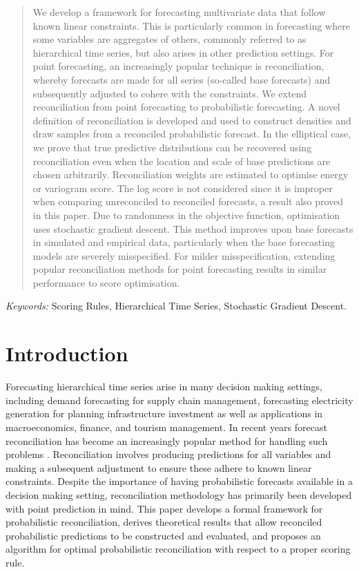 \documentclass[a4paper,12pt]{article}
\theoremstyle{definition}
\begin{document}
\begin{abstract}
We develop a framework for forecasting multivariate data that follow known linear constraints. This is particularly common in forecasting where some variables are aggregates of others, commonly referred to as hierarchical time series, but also arises in other prediction settings. For point forecasting, an increasingly popular technique is reconciliation, whereby forecasts are made for all series (so-called base forecasts) and subsequently adjusted to cohere with the constraints. We extend reconciliation from point forecasting to probabilistic forecasting. A novel definition of reconciliation is developed and used to construct densities and draw samples from a reconciled probabilistic forecast. In the elliptical case, we prove that true predictive distributions can be recovered using reconciliation even when the location and scale of base predictions are chosen arbitrarily. Reconciliation weights are estimated to optimise energy or variogram score. The log score is not considered since it is improper when comparing unreconciled to reconciled forecasts, a result also proved in this paper. Due to randomness in the objective function, optimisation uses stochastic gradient descent. This method improves upon base forecasts in simulated and empirical data, particularly when the base forecasting models are severely misspecified. For milder misspecification, extending popular reconciliation methods for point forecasting results in similar performance to score optimisation.

\end{abstract}

\noindent%
{\it Keywords:}  Scoring Rules, Hierarchical Time Series, Stochastic Gradient Descent.

{}
\section{Introduction}\label{sec:intro}

Forecasting hierarchical time series arise in many decision making settings, including demand forecasting for supply chain management, forecasting electricity generation for planning infrastructure investment as well as applications in macroeconomics, finance, and tourism management. In recent years forecast reconciliation has become an increasingly popular method for handling such problems \citep[see][for an overview]{FPP2018}. Reconciliation involves producing predictions for all variables and making a subsequent adjustment to ensure these adhere to known linear constraints. Despite the importance of having probabilistic forecasts available in a decision making setting, reconciliation methodology has primarily been developed with point prediction in mind. This paper develops a formal framework for probabilistic reconciliation, derives theoretical results that allow reconciled probabilistic predictions to be constructed and evaluated, and proposes an algorithm for optimal probabilistic reconciliation with respect to a proper scoring rule.
\end{document}
